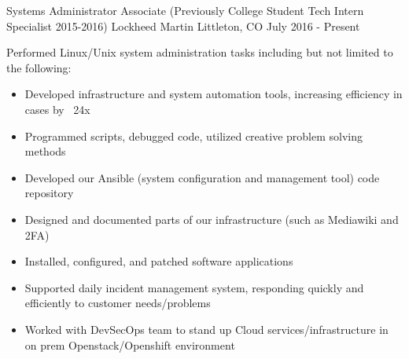 


\begin{cventries}
\vspace{-.25em}
\cventry
{Systems Administrator Associate (Previously College Student Tech Intern Specialist 2015-2016)} %
{Lockheed Martin} %
{Littleton, CO} %
{July 2016 - Present} %
{ %
\begin{cvitems}
\item {Performed Linux/Unix system administration tasks including but not limited to the following:}
  \begin{itemize}
  \item{Developed infrastructure and system automation tools, increasing efficiency in cases by ~24x}
  \item{Programmed scripts, debugged code, utilized creative problem solving methods}
  \item{Developed our Ansible (system configuration and management tool) code repository}
  \item{Designed and documented parts of our infrastructure (such as Mediawiki and 2FA)}
  \item{Installed, configured, and patched software applications}
  \item{Supported daily incident management system, responding quickly and efficiently to customer needs/problems}
  \item{Worked with DevSecOps team to stand up Cloud services/infrastructure in on prem Openstack/Openshift environment}
  \end{itemize}
\end{cvitems}
}


\end{cventries}

